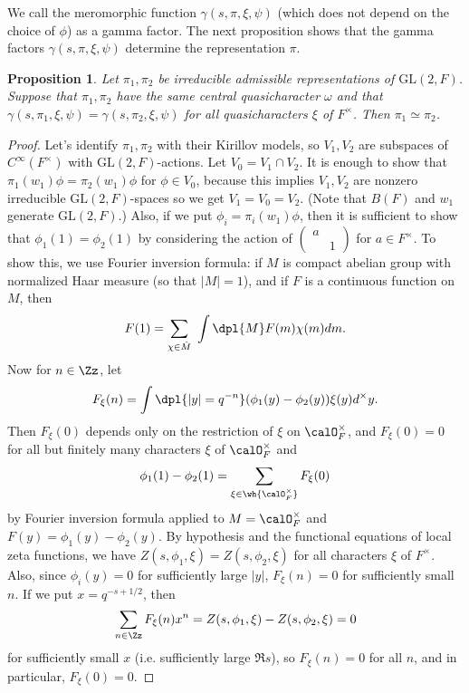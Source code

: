 \documentclass{article}
\newcommand{\GL}{\mathrm{GL}}
\newcommand{\smat}[4]{\left(\begin{smallmatrix} #1 & #2 \\ #3 & #4 \end{smallmatrix}\right)}
\newtheorem{proposition}{Proposition}[section]
\begin{document}
We call the meromorphic function $\gamma(s, \pi, \xi, \psi)$ (which does not depend on the choice of $\phi$) as a gamma factor. 
The next proposition shows that the gamma factors $\gamma(s, \pi, \xi, \psi)$ determine the representation $\pi$. 
\begin{proposition}
Let $\pi_1, \pi_2$ be irreducible admissible representations of $\GL(2, F)$. 
Suppose that $\pi_1, \pi_2$ have the same central quasicharacter $\omega$ and that $\gamma(s, \pi_1, \xi, \psi) = \gamma(s, \pi_2, \xi, \psi)$ for all quasicharacters $\xi$ of $F^{\times}$. 
Then $\pi_1\simeq \pi_2$. 
\end{proposition}
\begin{proof}
Let's identify $\pi_1, \pi_2$ with their Kirillov models, so $V_1, V_2$ are subspaces of $C^{\infty}(F^{\times})$ with $\GL(2, F)$-actions. 
Let $V_0 = V_1 \cap V_2$. 
It is enough to show that $\pi_1(w_1)\phi = \pi_2(w_1)\phi$ for $\phi\in V_0$, because this implies $V_1, V_2$ are nonzero irreducible $\GL(2, F)$-spaces so we get $V_1= V_0 = V_2$. (Note that $B(F)$ and $w_1$ generate $\GL(2, F)$.) 
Also, if we put $\phi_i = \pi_i(w_1)\phi$, then it is sufficient to show that $\phi_1(1) = \phi_2(1)$ by considering the action of $\smat{a}{}{}{1}$ for $a\in F^{\times}$. 
To show this, we use Fourier inversion formula: if $M$ is compact abelian group with normalized Haar measure (so that $|M| = 1$), and if $F$ is a continuous function on $M$, then 
$$
F(1) = \sum_{\chi\in \hat{M}} \,\,\int\dpl{M}F(m)\chi(m)dm.
$$
Now for $n\in \Zz$, let
$$
F_{\xi}(n) = \int\dpl{|y| = q^{-n}} (\phi_1(y) - \phi_2(y))\xi(y) d^{\times}y.
$$
Then $F_{\xi}(0)$ depends only on the restriction of $\xi$ on $\calO_{F}^{\times}$, and $F_{\xi}(0) = 0$ for all but finitely many characters $\xi$ of $\calO_{F}^{\times}$ and 
$$
\phi_{1}(1) - \phi_{2}(1) = \sum_{\xi\in \wh{\calO_{F}^{\times}}} F_{\xi}(0)
$$
by Fourier inversion formula applied to $M =\calO_{F}^{\times}$ and $F(y) = \phi_{1}(y) - \phi_{2}(y)$. 
By hypothesis and the functional equations of local zeta functions, we have $Z(s, \phi_1, \xi) = Z(s, \phi_2, \xi)$ for all characters $\xi$ of $F^{\times}$. 
Also, since $\phi_i(y) = 0$ for sufficiently large $|y|$, $F_{\xi}(n) =0$ for sufficiently small $n$. If we put $x = q^{-s +1/2}$, then 
$$
\sum_{n\in \Zz} F_{\xi}(n) x^{n} = Z(s, \phi_1, \xi) - Z(s, \phi_2, \xi) = 0
$$
for sufficiently small $x$ (i.e. sufficiently large $\Re s$), so $F_{\xi}(n) = 0$ for all $n$, and in particular, $F_{\xi}(0) = 0$. 
\end{proof}
\end{document}

